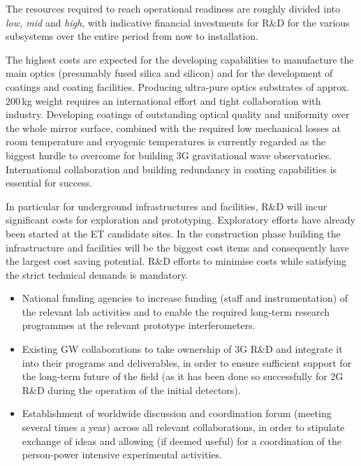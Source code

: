 The resources required to reach operational readiness are roughly divided into \textit{low, mid} and \textit{high}, with indicative financial investments for R\&D for the various subsystems %
over the entire period from now to installation. 

The highest costs are expected for the developing capabilities to manufacture the main optics (presumably fused silica and silicon) and for the development of coatings and coating facilities. 
Producing ultra-pure optics substrates of approx. 200\,kg weight requires an international effort and tight collaboration with industry. Developing coatings of outstanding optical quality and uniformity over the whole mirror surface, combined with the required low mechanical losses at  room temperature and cryogenic temperatures is currently regarded as the biggest hurdle to overcome for building 3G gravitational wave observatories. International collaboration and building redundancy in coating capabilities is essential for success.

In particular for underground infrastructures and facilities, R\&D will incur significant costs for exploration and prototyping. Exploratory efforts have already been started at the ET candidate sites. In the construction phase building the infrastructure and facilities will be the biggest cost items and consequently have the largest cost saving potential. R\&D efforts to minimise costs while satisfying the strict technical demands is mandatory.



\begin{itemize}
\item National funding agencies to increase funding (staff and instrumentation) of the relevant lab activities and to enable the required long-term research programmes at the relevant prototype interferometers.
\item Existing GW collaborations to take ownership of 3G R\&D and integrate it into their programs and deliverables, in order to ensure sufficient support for the long-term future of the field (as it has been done so successfully for 2G R\&D during the operation of the initial detectors). 
\item Establishment of worldwide discussion and coordination forum (meeting several times a year) across all relevant collaborations, in order to stipulate exchange of ideas and allowing (if deemed useful) for a coordination of the person-power intensive experimental activities.
\end{itemize}

